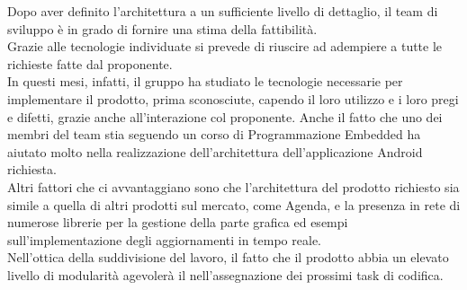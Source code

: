 Dopo aver definito l'architettura a un sufficiente livello di dettaglio, il team di sviluppo è in grado di fornire una stima della fattibilità.\\
Grazie alle tecnologie individuate si prevede di riuscire ad adempiere a tutte le richieste fatte dal proponente.\\
In questi mesi, infatti, il gruppo ha studiato le tecnologie necessarie per implementare il prodotto, prima sconosciute, capendo il loro utilizzo e i loro pregi e difetti, grazie anche all'interazione col proponente. Anche il fatto che uno dei membri del team stia seguendo un corso di Programmazione Embedded ha aiutato molto nella realizzazione dell'architettura dell'applicazione Android richiesta. \\
Altri fattori che ci avvantaggiano sono che l'architettura del prodotto richiesto sia simile a quella di altri prodotti sul mercato, come Agenda, e la presenza in rete di numerose librerie per la gestione della parte grafica ed esempi sull'implementazione degli aggiornamenti in tempo reale.\\
Nell'ottica della suddivisione del lavoro, il fatto che il prodotto abbia un elevato livello di modularità agevolerà il  nell'assegnazione dei prossimi task di codifica.\\